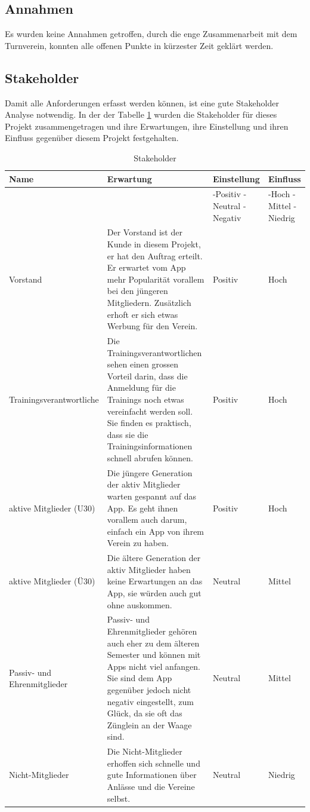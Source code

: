 \FloatBarrier
\subsection{Annahmen}\label{annahmen}
Es wurden keine Annahmen getroffen, durch die enge Zusammenarbeit mit dem Turnverein, konnten alle offenen Punkte in kürzester Zeit geklärt werden.

\newpage
\subsection{Stakeholder}\label{stakeholder}
Damit alle Anforderungen erfasst werden können, ist eine gute Stakeholder Analyse notwendig. In der der Tabelle \ref{table:stakeholder} wurden die Stakeholder für dieses Projekt zusammengetragen und ihre Erwartungen, ihre Einstellung und ihren Einfluss gegenüber diesem Projekt festgehalten.

\begin{table}[ht]
\centering
  \begin{tabular}{ l | p{5cm} | p{1.5cm} | p{1.5cm} }
	\hline
	\rowcolor{darkgray}
	Name							&	Erwartung		&	Einstellung 	&	Einfluss	\\ \hline
	\rowcolor{gray}
								&				&	-Positiv \mbox{-Neutral} \mbox{-Negativ} 	&	-Hoch \mbox{-Mittel} \mbox{-Niedrig} \\ \hline
	Vorstand						&	Der Vorstand ist der Kunde in diesem Projekt, er hat den Auftrag erteilt. Er erwartet vom App mehr Popularität vorallem bei den jüngeren Mitgliedern. Zusätzlich erhoft er sich etwas Werbung für den Verein.			
												& 	Positiv		&	Hoch		\\ \hline
	Trainingsverantwortliche				&	Die Trainingsverantwortlichen sehen einen grossen Vorteil darin, dass die Anmeldung für die Trainings noch etwas vereinfacht werden soll. Sie finden es praktisch, dass sie die Trainingsinformationen schnell abrufen können.			
												& 	Positiv		&	Hoch		\\ \hline
	aktive Mitglieder (U30)				&	Die jüngere Generation der aktiv Mitglieder warten gespannt auf das App. Es geht ihnen vorallem auch darum, einfach ein App von ihrem Verein zu haben.			
												& 	Positiv		&	Hoch		\\ \hline
	aktive Mitglieder (Ü30)				&	Die ältere Generation der aktiv Mitglieder haben keine Erwartungen an das App, sie würden auch gut ohne auskommen. 		
												& 	Neutral	&	Mittel		\\ \hline
	Passiv- und Ehrenmitglieder			&	Passiv- und Ehrenmitglieder gehören auch eher zu dem älteren Semester und können mit Apps nicht viel anfangen. Sie sind dem App gegenüber jedoch nicht negativ eingestellt, zum Glück, da sie oft das Zünglein an der Waage sind.
												& 	Neutral	&	Mittel		\\ \hline
	Nicht-Mitglieder					&	Die Nicht-Mitglieder erhoffen sich schnelle und gute Informationen über Anlässe und die Vereine selbst.
												& 	Neutral	&	Niedrig	\\ \hline
  \end{tabular}
   \caption{Stakeholder}\label{table:stakeholder}
\end{table}

